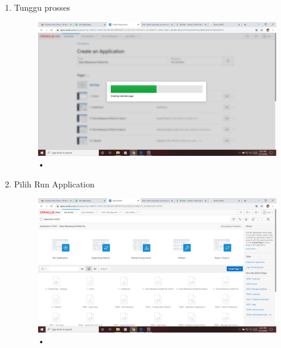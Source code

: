 \documentclass[12pt, times new roman, a4paper]{article}
\begin{document}
\begin{enumerate}
\begin{figure}[h]
	\caption{•}
\end{figure}
\\
\\
\\
\\
\\
\\
\\
\\
\\
\\
\\
\\
\\
\item Tunggu prosses
\begin{figure}[h]
	\centering
		\includegraphics[scale=0.2]{Gambar/Capture13}
	\caption{•}
\end{figure}
\item Pilih Run Application
\begin{figure}[h]
	\centering
		\includegraphics[scale=0.2]{Gambar/Capture14}
	\caption{•}
\end{figure}
\\

\end{enumerate}
\end{document}

